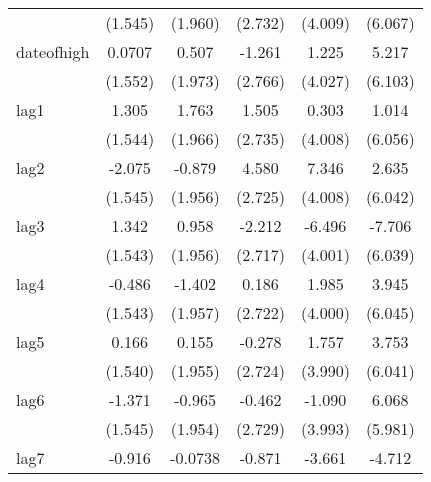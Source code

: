 {\begin{tabular}{l*{5}{c}}
            &     (1.545)         &     (1.960)         &     (2.732)         &     (4.009)         &     (6.067)         \\
[1em]
dateofhigh  &      0.0707         &       0.507         &      -1.261         &       1.225         &       5.217         \\
            &     (1.552)         &     (1.973)         &     (2.766)         &     (4.027)         &     (6.103)         \\
[1em]
lag1        &       1.305         &       1.763         &       1.505         &       0.303         &       1.014         \\
            &     (1.544)         &     (1.966)         &     (2.735)         &     (4.008)         &     (6.056)         \\
[1em]
lag2        &      -2.075         &      -0.879         &       4.580         &       7.346         &       2.635         \\
            &     (1.545)         &     (1.956)         &     (2.725)         &     (4.008)         &     (6.042)         \\
[1em]
lag3        &       1.342         &       0.958         &      -2.212         &      -6.496         &      -7.706         \\
            &     (1.543)         &     (1.956)         &     (2.717)         &     (4.001)         &     (6.039)         \\
[1em]
lag4        &      -0.486         &      -1.402         &       0.186         &       1.985         &       3.945         \\
            &     (1.543)         &     (1.957)         &     (2.722)         &     (4.000)         &     (6.045)         \\
[1em]
lag5        &       0.166         &       0.155         &      -0.278         &       1.757         &       3.753         \\
            &     (1.540)         &     (1.955)         &     (2.724)         &     (3.990)         &     (6.041)         \\
[1em]
lag6        &      -1.371         &      -0.965         &      -0.462         &      -1.090         &       6.068         \\
            &     (1.545)         &     (1.954)         &     (2.729)         &     (3.993)         &     (5.981)         \\
[1em]
lag7        &      -0.916         &     -0.0738         &      -0.871         &      -3.661         &      -4.712         \\

\end{tabular}}
